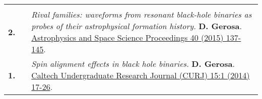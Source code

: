{\begin{longtable}{rp{0.3cm}p{15.8cm}}
\vspace{0.09cm}\\
%
\textbf{2.} & & \textit{Rival families: waveforms from resonant black-hole binaries as probes of their astrophysical formation history.}
\newline{}
\textbf{D. Gerosa}.
\newline{}
\href{http://dx.doi.org/10.1007/978-3-319-10488-1_12}{Astrophysics and Space Science Proceedings 40 (2015) 137-145}. 
\vspace{0.09cm}\\
%
\textbf{1.} & & \textit{Spin alignment effects in black hole binaries.}
\newline{}
\textbf{D. Gerosa}.
\newline{}
\href{https://caltechcampuspubs.library.caltech.edu/2800/}{Caltech Undergraduate Research Journal (CURJ) 15:1 (2014) 17-26}. 
\vspace{0.09cm}\\
%
\end{longtable} }